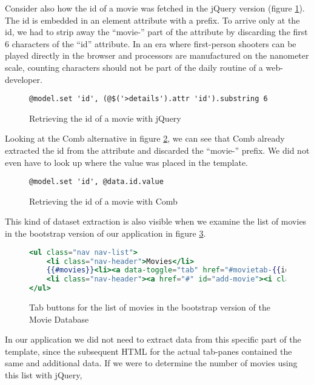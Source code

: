 \documentclass[thesis.tex]{subfiles}
\begin{document}
Consider also how the id of a movie was fetched in the jQuery version
(figure \ref{fig:jquery-fetch-substring}). The id is embedded in an element
attribute with a prefix. To arrive only at the id, we had to strip away the
``movie-'' part of the attribute by discarding the first 6 characters of the
``id'' attribute.
In an era where first-person shooters can be played directly in the browser
and processors are manufactured on the nanometer scale, counting characters
should not be part of the daily routine of a web-developer.
\begin{figure}
	\centering
	\begin{lstlisting}
@model.set 'id', (@$('>details').attr 'id').substring 6
	\end{lstlisting}
	\caption{Retrieving the id of a movie with jQuery}
	\label{fig:jquery-fetch-substring}
\end{figure}
Looking at the Comb alternative in figure \ref{fig:comb-fetch-substring}, we can
see that Comb already extracted the id from the attribute and discarded the
``movie-'' prefix.
We did not even have to look up where the value was placed in the template.
\begin{figure}
	\centering
	\begin{lstlisting}
@model.set 'id', @data.id.value
	\end{lstlisting}
	\caption{Retrieving the id of a movie with Comb}
	\label{fig:comb-fetch-substring}
\end{figure}
This kind of dataset extraction is also visible when we examine the list of
movies in the bootstrap version of our application in figure
\ref{fig:movielist.mustache}.
\begin{figure}
	\centering
	\begin{lstlisting}[language=mustache]
<ul class="nav nav-list">
	<li class="nav-header">Movies</li>
	{{#movies}}<li><a data-toggle="tab" href="#movietab-{{id}}">{{title}}</a></li>{{/movies}}
	<li class="nav-header"><a href="#" id="add-movie"><i class="icon-plus"></i></a></li>
</ul>
	\end{lstlisting}
	\caption{Tab buttons for the list of movies in the bootstrap version of the Movie Database}
	\label{fig:movielist.mustache}
\end{figure}
In our application we did not need to extract data
from this specific part of the template, since the subsequent HTML for the
actual tab-panes contained the same and additional data.
If we were to determine the number of movies using this list with jQuery,
\end{document}
